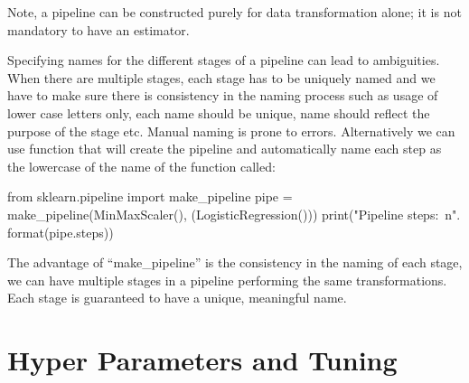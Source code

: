 Note, a pipeline can be constructed purely for data transformation alone; it is not mandatory to have an estimator.


Specifying names for the different stages of a pipeline can lead to ambiguities. When there are multiple stages, each stage has to be uniquely named and we have to make sure there is consistency in the naming process such as usage of lower case letters only, each name should be unique, name should reflect the purpose of the stage etc. Manual naming is prone to errors.
Alternatively we can use  function that will create the pipeline and automatically name each step as the lowercase of the name of the function called:

	\begin{code}[\codenumbering]{}
		\codeitemnonumber from sklearn.pipeline import make\_pipeline
		\codeitemnonumber pipe = make\_pipeline(MinMaxScaler(), (LogisticRegression()))
		\codeitemnonumber print("Pipeline steps:\ n{}". format(pipe.steps))
	\end{code}

The advantage of ``make\_pipeline'' is the consistency in the naming of each stage, we can have multiple stages in a pipeline performing the same transformations.  Each stage is guaranteed to have a unique, meaningful name.

	\section{Hyper Parameters and Tuning}

